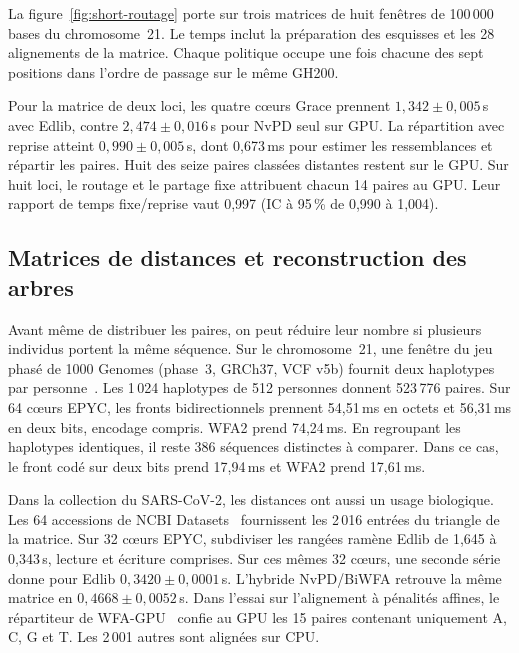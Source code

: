 La figure~\ref{fig:short-routage} porte sur trois matrices de huit fenêtres de 100\,000 bases du chromosome~21. Le temps inclut la préparation des esquisses et les 28 alignements de la matrice. Chaque politique occupe une fois chacune des sept positions dans l’ordre de passage sur le même GH200.

Pour la matrice de deux loci, les quatre cœurs Grace prennent \(1{,}342\pm0{,}005\)\,s avec Edlib, contre \(2{,}474\pm0{,}016\)\,s pour NvPD seul sur GPU. La répartition avec reprise atteint \(0{,}990\pm0{,}005\)\,s, dont 0,673\,ms pour estimer les ressemblances et répartir les paires. Huit des seize paires classées distantes restent sur le GPU. Sur huit loci, le routage et le partage fixe attribuent chacun 14 paires au GPU. Leur rapport de temps fixe/reprise vaut 0,997 (IC à 95\,\% de 0,990 à 1,004).


\subsection{Matrices de distances et reconstruction des arbres}
Avant même de distribuer les paires, on peut réduire leur nombre si plusieurs individus portent la même séquence. Sur le chromosome~21, une fenêtre du jeu phasé de 1000 Genomes (phase~3, GRCh37, VCF v5b) fournit deux haplotypes par personne~\cite{thousandgenomes,phase3vcf}. Les 1\,024 haplotypes de 512 personnes donnent 523\,776 paires. Sur 64 cœurs EPYC, les fronts bidirectionnels prennent 54,51\,ms en octets et 56,31\,ms en deux bits, encodage compris. WFA2 prend 74,24\,ms. En regroupant les haplotypes identiques, il reste 386 séquences distinctes à comparer. Dans ce cas, le front codé sur deux bits prend 17,94\,ms et WFA2 prend 17,61\,ms.

Dans la collection du SARS-CoV-2, les distances ont aussi un usage biologique. Les 64 accessions de NCBI Datasets~\cite{ncbidatasets} fournissent les 2\,016 entrées du triangle de la matrice. Sur 32 cœurs EPYC, subdiviser les rangées ramène Edlib de 1,645 à 0,343\,s, lecture et écriture comprises. Sur ces mêmes 32 cœurs, une seconde série donne pour Edlib \(0{,}3420\pm0{,}0001\)\,s. L’hybride NvPD/BiWFA retrouve la même matrice en \(0{,}4668\pm0{,}0052\)\,s. Dans l’essai sur l’alignement à pénalités affines, le répartiteur de WFA-GPU~\cite{wfagpuaffine,wfagpucode} confie au GPU les 15 paires contenant uniquement A, C, G et T. Les 2\,001 autres sont alignées sur CPU.

